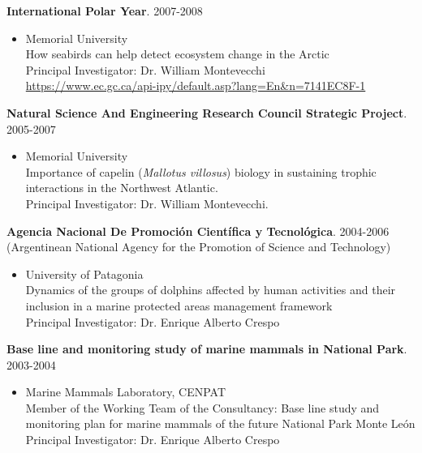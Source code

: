 \documentclass{res}
\begin{document}
\begin{resume}
\pagebreak

\textbf{International Polar Year}. 2007-2008
\begin{itemize} %
	\item[] Memorial University\\
How seabirds can help detect ecosystem change in the Arctic\\
Principal Investigator: Dr. William Montevecchi\\
\url{https://www.ec.gc.ca/api-ipy/default.asp?lang=En&n=7141EC8F-1}
\end{itemize}

\textbf{Natural Science And Engineering Research Council Strategic Project}. 2005-2007
\begin{itemize} %
	\item[] Memorial University\\
Importance of capelin (\textit{Mallotus villosus}) biology in sustaining trophic interactions in the Northwest Atlantic. \\
Principal Investigator: Dr. William Montevecchi.
\end{itemize}

\textbf{Agencia Nacional De Promoci\'{o}n Cient\'{i}fica y Tecnol\'{o}gica}. 2004-2006\\
(Argentinean National Agency for the Promotion of Science and Technology)
\begin{itemize} %
	\item[] University of Patagonia\\
Dynamics of the groups of dolphins affected by human activities and their inclusion in a marine protected areas management framework\\ 
Principal Investigator: Dr. Enrique Alberto Crespo
\end{itemize}

\textbf{Base line and monitoring study of marine mammals in National Park}. 2003-2004
\begin{itemize} %
	\item[] Marine Mammals Laboratory, CENPAT\\
Member of the Working Team of the Consultancy: Base line study and monitoring plan for marine mammals of the future National Park Monte Le\'{o}n\\
Principal Investigator: Dr. Enrique Alberto Crespo
\end{itemize}


\end{resume}
\end{document}
